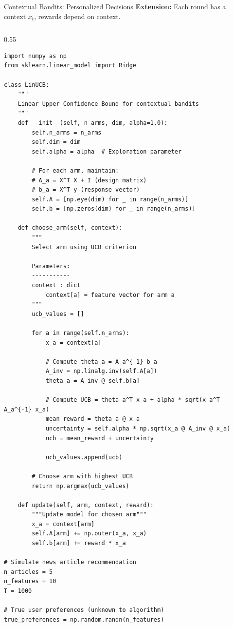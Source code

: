 \begin{frame}[fragile]{Contextual Bandits: Personalized Decisions}
\textbf{Extension:} Each round has a context $x_t$, rewards depend on context.

\begin{columns}
\begin{column}{0.55\textwidth}
\begin{lstlisting}[basicstyle=\ttfamily\tiny]
import numpy as np
from sklearn.linear_model import Ridge

class LinUCB:
    """
    Linear Upper Confidence Bound for contextual bandits
    """
    def __init__(self, n_arms, dim, alpha=1.0):
        self.n_arms = n_arms
        self.dim = dim
        self.alpha = alpha  # Exploration parameter

        # For each arm, maintain:
        # A_a = X^T X + I (design matrix)
        # b_a = X^T y (response vector)
        self.A = [np.eye(dim) for _ in range(n_arms)]
        self.b = [np.zeros(dim) for _ in range(n_arms)]

    def choose_arm(self, context):
        """
        Select arm using UCB criterion

        Parameters:
        -----------
        context : dict
            context[a] = feature vector for arm a
        """
        ucb_values = []

        for a in range(self.n_arms):
            x_a = context[a]

            # Compute theta_a = A_a^{-1} b_a
            A_inv = np.linalg.inv(self.A[a])
            theta_a = A_inv @ self.b[a]

            # Compute UCB = theta_a^T x_a + alpha * sqrt(x_a^T A_a^{-1} x_a)
            mean_reward = theta_a @ x_a
            uncertainty = self.alpha * np.sqrt(x_a @ A_inv @ x_a)
            ucb = mean_reward + uncertainty

            ucb_values.append(ucb)

        # Choose arm with highest UCB
        return np.argmax(ucb_values)

    def update(self, arm, context, reward):
        """Update model for chosen arm"""
        x_a = context[arm]
        self.A[arm] += np.outer(x_a, x_a)
        self.b[arm] += reward * x_a

# Simulate news article recommendation
n_articles = 5
n_features = 10
T = 1000

# True user preferences (unknown to algorithm)
true_preferences = np.random.randn(n_features)


\end{lstlisting}
\end{column}
\end{columns}
\end{frame}
